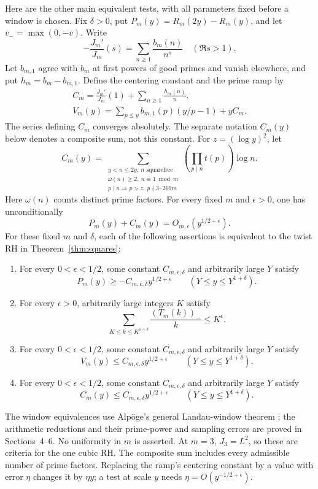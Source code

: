 \documentclass[11pt]{article}
\begin{document}
Here are the other main equivalent tests, with all parameters fixed
before a window is chosen. Fix $\delta>0$, put
$P_m(y)=R_m(2y)-R_m(y)$, and let $v_-=\max(0,-v)$.
Write
\[
 -\frac{J_m'}{J_m}(s)=\sum_{n\ge1}\frac{b_m(n)}{n^s}
           \quad(\Re s>1).
\]
Let $b_{m,1}$ agree with $b_m$ at first powers of good primes and
vanish elsewhere, and put $h_m=b_m-b_{m,1}$. Define the centering
constant and the prime ramp by
\[
 \begin{gathered}
 C_m=\frac{J_m'}{J_m}(1)+\sum_{n\ge1}\frac{h_m(n)}n,\\
 V_m(y)=\sum_{p\le y}b_{m,1}(p)(y/p-1)+yC_m.
 \end{gathered}
\]
The series defining $C_m$ converges absolutely. The separate
notation $C_m(y)$ below denotes a composite sum, not this constant.
For $z=(\log y)^2$, let
\[
 C_m(y)=\sum_{\substack{y<n\le2y,\ n\text{ squarefree}\\
             \omega(n)\ge2,\ n\equiv1\bmod m\\
             p\mid n\Rightarrow p>z,\ p\nmid3\cdot269m}}
                     \left(\prod_{p\mid n}t(p)\right)\log n.
\]
Here $\omega(n)$ counts distinct prime factors.
For every fixed $m$ and $\epsilon>0$, one has unconditionally
\[
 P_m(y)+C_m(y)=O_{m,\epsilon}(y^{1/2+\epsilon}).
\]
For these fixed $m$ and $\delta$, each of the following assertions
is equivalent to the twist RH in Theorem~\ref{thm:squares}:
\begin{enumerate}
\item For every $0<\epsilon<1/2$, some constant
$C_{m,\epsilon,\delta}$ and arbitrarily large $Y$ satisfy
\[
 P_m(y)\ge-C_{m,\epsilon,\delta}y^{1/2+\epsilon}
       \qquad(Y\le y\le Y^{1+\delta}).
\]
\item For every $\epsilon>0$, arbitrarily large integers $K$
satisfy
\[
 \sum_{K\le k\le K^{1+\delta}}\frac{(T_m(k))_-}{k}\le K^\epsilon.
\]
\item For every $0<\epsilon<1/2$, some constant
$C_{m,\epsilon,\delta}$ and arbitrarily large $Y$ satisfy
\[
 V_m(y)\le C_{m,\epsilon,\delta}y^{1/2+\epsilon}
       \qquad(Y\le y\le Y^{1+\delta}).
\]
\item For every $0<\epsilon<1/2$, some constant
$C_{m,\epsilon,\delta}$ and arbitrarily large $Y$ satisfy
\[
 C_m(y)\le C_{m,\epsilon,\delta}y^{1/2+\epsilon}
       \qquad(Y\le y\le Y^{1+\delta}).
\]
\end{enumerate}
The window equivalences use Alp\"oge's general Landau-window
theorem \cite{AlpogeWindow}; the arithmetic reductions and their
prime-power and sampling errors are proved in Sections~4--6.
No uniformity in $m$ is asserted. At $m=3$, $J_3=L^2$, so these
are criteria for the one cubic RH. The composite sum includes
every admissible number of prime factors. Replacing the ramp's
centering constant by a value with error $\eta$ changes it by
$\eta y$; a test at scale $y$ needs
$\eta=O(y^{-1/2+\epsilon})$.
\end{document}
